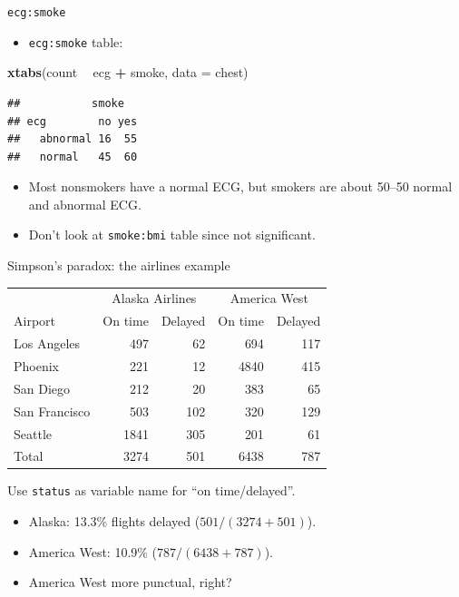 \documentclass[ignorenonframetext,]{beamer}
\newenvironment{Shaded}{\begin{snugshade}}{\end{snugshade}}
\newcommand{\DataTypeTok}[1]{\textcolor[rgb]{0.13,0.29,0.53}{#1}}
\newcommand{\KeywordTok}[1]{\textcolor[rgb]{0.13,0.29,0.53}{\textbf{#1}}}
\newcommand{\NormalTok}[1]{#1}
\newcommand{\OperatorTok}[1]{\textcolor[rgb]{0.81,0.36,0.00}{\textbf{#1}}}
\newcommand{\StringTok}[1]{\textcolor[rgb]{0.31,0.60,0.02}{#1}}
\providecommand{\tightlist}{%
  \setlength{\itemsep}{0pt}\setlength{\parskip}{0pt}}
\begin{document}
\begin{frame}[fragile]{\texttt{ecg:smoke}}
\protect\hypertarget{ecgsmoke}{}

\begin{itemize}
\tightlist
\item
  \texttt{ecg:smoke} table:
\end{itemize}

\begin{Shaded}
\begin{Highlighting}[]
\KeywordTok{xtabs}\NormalTok{(count }\OperatorTok{~}\StringTok{ }\NormalTok{ecg }\OperatorTok{+}\StringTok{ }\NormalTok{smoke, }\DataTypeTok{data =}\NormalTok{ chest)}
\end{Highlighting}
\end{Shaded}

\begin{verbatim}
##           smoke
## ecg        no yes
##   abnormal 16  55
##   normal   45  60
\end{verbatim}

\begin{itemize}
\item
  Most nonsmokers have a normal ECG, but smokers are about 50--50 normal
  and abnormal ECG.
\item
  Don't look at \texttt{smoke:bmi} table since not significant.
\end{itemize}

\end{frame}

\begin{frame}[fragile]{Simpson's paradox: the airlines example}
\protect\hypertarget{simpsons-paradox-the-airlines-example}{}

\begin{tabular}{|l|rr|rr|}
\hline
& \multicolumn{2}{|c|}{Alaska Airlines} & 
\multicolumn{2}{|c|}{America West}\\
Airport & On time & Delayed & On time & Delayed\\
\hline
Los Angeles & 497 & 62 & 694 & 117\\
Phoenix & 221 & 12 & 4840 & 415\\
San Diego & 212 & 20 & 383 & 65\\
San Francisco & 503 & 102 & 320 & 129 \\
Seattle & 1841 & 305 & 201 & 61\\
\hline
Total & 3274 & 501 & 6438 & 787\\
\hline
\end{tabular}
\vspace{2ex}

Use \texttt{status} as variable name for ``on time/delayed''.

\begin{itemize}
\item
  Alaska: 13.3\% flights delayed (\(501/(3274+501)\)).
\item
  America West: 10.9\% (\(787/(6438+787)\)).
\item
  America West more punctual, right?
\end{itemize}

\end{frame}
\end{document}
